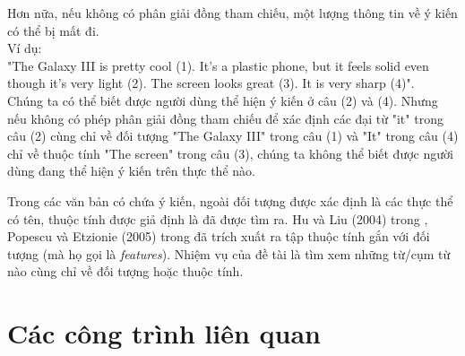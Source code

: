 \documentclass[12pt]{report}
\begin{document}
		\par Hơn nữa, nếu không có phân giải đồng tham chiếu, một lượng thông tin về ý kiến có thể bị mất đi.\\
		Ví dụ:\\
		"The Galaxy III is pretty cool (1). It's a plastic phone, but it feels solid even though it's very light (2). The screen looks great (3). It is very sharp (4)".
		\\Chúng ta có thể biết được người dùng thể hiện ý kiến ở câu (2) và (4). Nhưng nếu không có phép phân giải đồng tham chiếu để xác định các đại từ "it" trong câu (2) cùng chỉ về đối tượng "The Galaxy III" trong câu (1) và "It" trong câu (4) chỉ về thuộc tính "The screen" trong câu (3), chúng ta không thể biết được người dùng đang thể hiện ý kiến trên thực thể nào.
		\par Trong các văn bản có chứa ý kiến, ngoài đối tượng được xác định là các thực thể có tên, thuộc tính được giả định là đã được tìm ra. Hu và Liu (2004) trong \cite{findfeatures1}, Popescu và Etzionie (2005) trong \cite{findfeatures2} đã trích xuất ra tập thuộc tính gắn với đối tượng (mà họ gọi là \textit{features}). Nhiệm vụ của đề tài là tìm xem những từ/cụm từ nào cùng chỉ về đối tượng hoặc thuộc tính.

	\chapter{Các công trình liên quan}				
\end{document}
